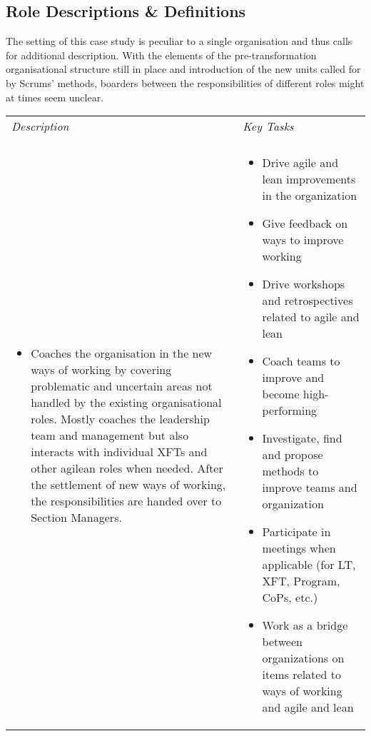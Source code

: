 \subsection{Role Descriptions \& Definitions}

The setting of this case study is peculiar to a single organisation and thus calls for additional description. With the elements of the pre-transformation organisational structure still in place and introduction of the new units called for by Scrums' methods, boarders between the responsibilities of different roles might at times seem unclear.

\begin{table}
   \begin{tabularx}{\textwidth}{ | p{5.6cm} | p{5.6cm} | }
   
   \hline
   \emph{Description} & \emph{Key Tasks} \\ 
   \hhline{==}
   
   \multicolumn{2}{ | c | }{\textbf{Agilean Coach}}
   
   \\ \hline
   
   \begin{itemize}[label={}, leftmargin=*, topsep=0pt, itemsep=0pt, partopsep=0pt]
     \item Coaches the organisation in the new ways of working by covering problematic and uncertain areas not handled by the existing organisational roles. Mostly coaches the leadership team and management but also interacts with individual XFTs and other agilean roles when needed. After the settlement of new ways of working, the responsibilities are handed over to Section Managers. 
   \end{itemize} &
   
   \begin{itemize}[label={}, leftmargin=*, topsep=0pt, itemsep=0pt, partopsep=0pt]
     \item Drive agile and lean improvements in the organization
     \item Give feedback on ways to improve working
     \item Drive workshops and retrospectives related to agile and lean
     \item Coach teams to improve and become high-performing
     \item Investigate, find and propose methods to improve teams and organization
     \item Participate in meetings when applicable (for LT, XFT, Program, CoPs, etc.)
     \item Work as a bridge between organizations on items related to ways of working and agile and lean  
   \end{itemize}
   

\end{tabularx}
\end{table}
